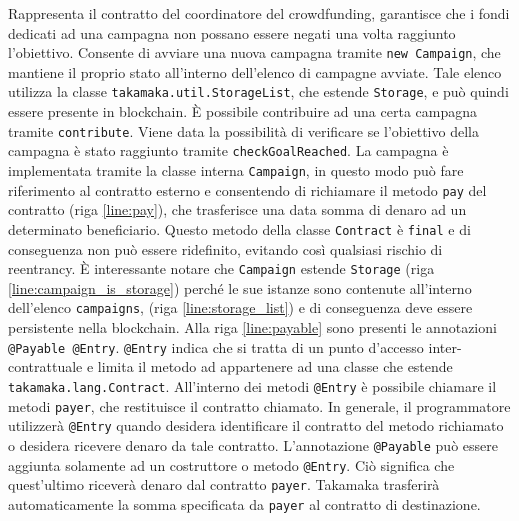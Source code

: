 %
Rappresenta il contratto del coordinatore del crowdfunding, garantisce che i fondi dedicati ad una campagna non possano essere negati una volta raggiunto l'obiettivo. Consente di avviare una nuova campagna tramite \lstinline|new Campaign|, che mantiene il proprio stato all'interno dell'elenco di campagne avviate. Tale elenco utilizza la classe \lstinline|takamaka.util.StorageList|, che estende \lstinline|Storage|, e può quindi essere presente in blockchain. È possibile contribuire ad una certa campagna tramite \lstinline|contribute|. Viene data la possibilità di verificare se l'obiettivo della campagna è stato raggiunto tramite \lstinline|checkGoalReached|. La campagna è implementata tramite la classe interna \lstinline|Campaign|, in questo modo può fare riferimento al contratto esterno e consentendo di richiamare il metodo \lstinline|pay| del contratto (riga \ref{line:pay}), che trasferisce una data somma di denaro ad un determinato beneficiario. Questo metodo della classe \lstinline|Contract| è \lstinline|final| e di conseguenza non può essere ridefinito, evitando così qualsiasi rischio di reentrancy. È interessante notare che \lstinline|Campaign| estende \lstinline|Storage| (riga \ref{line:campaign_is_storage}) perché le sue istanze sono contenute all'interno dell'elenco \lstinline|campaigns|, (riga \ref{line:storage_list}) e di conseguenza deve essere persistente nella blockchain.
Alla riga \ref{line:payable} sono presenti le annotazioni \lstinline|@Payable @Entry|. \lstinline|@Entry| indica che si tratta di un punto d'accesso inter-contrattuale e limita il metodo ad appartenere ad una classe che estende \lstinline|takamaka.lang.Contract|. All'interno dei metodi \lstinline|@Entry| è possibile chiamare il metodi \lstinline|payer|, che restituisce il contratto chiamato. In generale, il programmatore utilizzerà \lstinline|@Entry| quando desidera identificare il contratto del metodo richiamato o desidera ricevere denaro da tale contratto. L'annotazione \lstinline|@Payable| può essere aggiunta solamente ad un costruttore o metodo \lstinline|@Entry|. Ciò significa che quest'ultimo riceverà denaro dal contratto \lstinline|payer|. Takamaka trasferirà automaticamente la somma specificata da \lstinline|payer| al contratto di destinazione.

